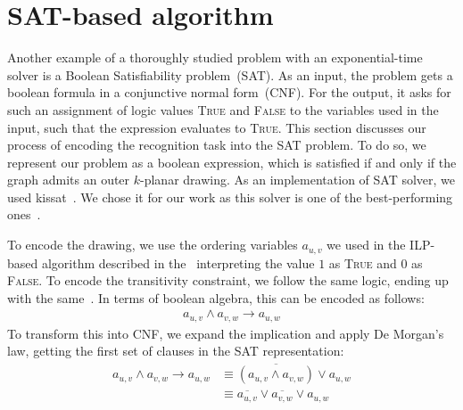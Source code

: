 \section{SAT-based algorithm}\label{sec:SAT-def}

Another example of a thoroughly studied problem with an exponential-time solver is a Boolean Satisfiability problem~(SAT). As an input, the problem gets a boolean formula in a conjunctive normal form~(CNF). For the output, it asks for such an assignment of logic values \textsc{True} and \textsc{False} to the variables used in the input, such that the expression evaluates to \textsc{True}. This section discusses our process of encoding the recognition task into the SAT problem. To do so, we represent our problem as a boolean expression, which is satisfied if and only if the graph admits an outer \(k\)-planar drawing. As an implementation of SAT solver, we used kissat~\cite{kissat,kissat-library}. We chose it for our work as this solver is one of the best-performing ones~\cite{sat-competition}.

To encode the drawing, we use the ordering variables \(a_{u, v}\) we used in the ILP-based algorithm described in the~ interpreting the value \(1\) as \textsc{True} and \(0\) as \textsc{False}. To encode the transitivity constraint, we follow the same logic, ending up with the same~. In terms of boolean algebra, this can be encoded as follows:
\begin{align*}
    a_{u, v} \land a_{v, w} \rightarrow a_{u, w}
\end{align*}
To transform this into CNF, we expand the implication and apply De Morgan's law, getting the first set of clauses in the SAT representation:
\begin{align}
    a_{u, v} \land a_{v, w} \rightarrow a_{u, w}
    &\equiv \overline{(a_{u, v} \land a_{v, w})} \lor a_{u, w} \nonumber \\
    &\equiv \overline{a_{u, v}} \lor \overline{a_{v, w}} \lor a_{u, w} \label{sat:trans}
\end{align}

